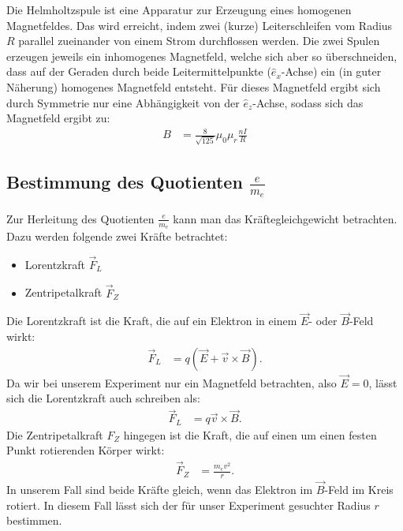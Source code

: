 Die Helmholtzspule ist eine Apparatur zur Erzeugung eines homogenen Magnetfeldes. Das wird erreicht, indem zwei (kurze) Leiterschleifen vom Radius $R$ parallel zueinander von einem Strom durchflossen werden. Die zwei Spulen erzeugen jeweils ein inhomogenes Magnetfeld, welche sich aber so überschneiden, dass auf der Geraden durch beide Leitermittelpunkte ($\hat{e}_x$-Achse) ein (in guter Näherung) homogenes Magnetfeld entsteht. Für dieses Magnetfeld ergibt sich durch Symmetrie nur eine Abhängigkeit von der $\hat{e}_z$-Achse, sodass sich das Magnetfeld ergibt zu:
\begin{align}
B&=\frac{8}{\sqrt{125}}\mu_0\mu_r\frac{nI}{R} \label{helm}
\end{align}

\subsection{Bestimmung des Quotienten $\frac{e}{m_e}$}
Zur Herleitung des Quotienten $\frac{e}{m_e}$ kann man das Kräftegleichgewicht betrachten. Dazu werden folgende zwei Kräfte betrachtet:
\begin{itemize}
\item Lorentzkraft $\vec{F}_L$
\item Zentripetalkraft $\vec{F}_Z$
\end{itemize}
Die Lorentzkraft ist die Kraft, die auf ein Elektron in einem $\vec{E}$- oder $\vec{B}$-Feld wirkt:
\begin{align*}
\vec{F}_L&=q\left(\vec{E}+\vec{v}\times\vec{B}\right)\text{.}
\end{align*}
Da wir bei unserem Experiment nur ein Magnetfeld betrachten, also $\vec{E}=0$, lässt sich die Lorentzkraft auch schreiben als:
\begin{align}
\vec{F}_L&=q\vec{v}\times\vec{B}.
\end{align}
Die Zentripetalkraft $F_Z$ hingegen ist die Kraft, die auf einen um einen festen Punkt rotierenden Körper wirkt:
\begin{align}
\vec{F}_Z&=\frac{m_ev^2}{r}\text{.}
\end{align}
In unserem Fall sind beide Kräfte gleich, wenn das Elektron im $\vec{B}$-Feld im Kreis rotiert. In diesem Fall lässt sich der für
unser Experiment gesuchter Radius $r$ bestimmen.

